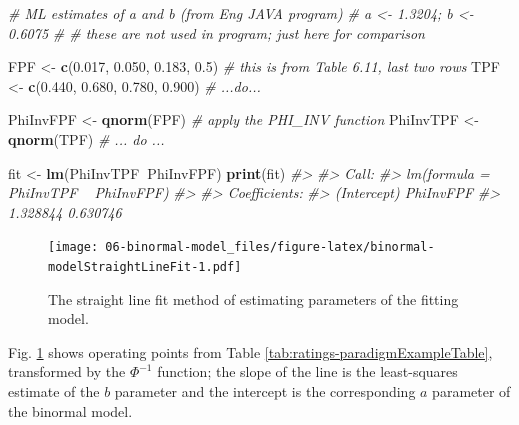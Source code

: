 \documentclass[
]{book}
\newenvironment{Shaded}{\begin{snugshade}}{\end{snugshade}}
\newcommand{\CommentTok}[1]{\textcolor[rgb]{0.56,0.35,0.01}{\textit{#1}}}
\newcommand{\FloatTok}[1]{\textcolor[rgb]{0.00,0.00,0.81}{#1}}
\newcommand{\KeywordTok}[1]{\textcolor[rgb]{0.13,0.29,0.53}{\textbf{#1}}}
\newcommand{\NormalTok}[1]{#1}
\newcommand{\OperatorTok}[1]{\textcolor[rgb]{0.81,0.36,0.00}{\textbf{#1}}}
\newcommand{\StringTok}[1]{\textcolor[rgb]{0.31,0.60,0.02}{#1}}
\begin{document}
\begin{Shaded}
\begin{Highlighting}[]
\CommentTok{# ML estimates of a and b (from Eng JAVA program)}
\CommentTok{# a <- 1.3204; b <- 0.6075 }
\CommentTok{# # these are not used in program; just here for comparison}

\NormalTok{FPF <-}\StringTok{ }\KeywordTok{c}\NormalTok{(}\FloatTok{0.017}\NormalTok{, }\FloatTok{0.050}\NormalTok{, }\FloatTok{0.183}\NormalTok{, }\FloatTok{0.5}\NormalTok{)  }
\CommentTok{# this is from Table 6.11, last two rows}
\NormalTok{TPF <-}\StringTok{ }\KeywordTok{c}\NormalTok{(}\FloatTok{0.440}\NormalTok{, }\FloatTok{0.680}\NormalTok{, }\FloatTok{0.780}\NormalTok{, }\FloatTok{0.900}\NormalTok{)}
\CommentTok{# ...do...}

\NormalTok{PhiInvFPF <-}\StringTok{ }\KeywordTok{qnorm}\NormalTok{(FPF)}
\CommentTok{# apply the PHI_INV function}
\NormalTok{PhiInvTPF <-}\StringTok{ }\KeywordTok{qnorm}\NormalTok{(TPF)}
\CommentTok{# ... do ... }

\NormalTok{fit <-}\StringTok{ }\KeywordTok{lm}\NormalTok{(PhiInvTPF}\OperatorTok{~}\NormalTok{PhiInvFPF)}
\KeywordTok{print}\NormalTok{(fit)}
\CommentTok{#> }
\CommentTok{#> Call:}
\CommentTok{#> lm(formula = PhiInvTPF ~ PhiInvFPF)}
\CommentTok{#> }
\CommentTok{#> Coefficients:}
\CommentTok{#> (Intercept)    PhiInvFPF  }
\CommentTok{#>    1.328844     0.630746}
\end{Highlighting}
\end{Shaded}

\begin{figure}
\centering
\texttt{[image: 06-binormal-model\_files/figure-latex/binormal-modelStraightLineFit-1.pdf]}
\caption{\label{fig:binormal-modelStraightLineFit}The straight line fit method of estimating parameters of the fitting model.}
\end{figure}

Fig. \ref{fig:binormal-modelStraightLineFit} shows operating points from Table \ref{tab:ratings-paradigmExampleTable}, transformed by the \(\Phi^{-1}\) function; the slope of the line is the least-squares estimate of the \(b\) parameter and the intercept is the corresponding \(a\) parameter of the binormal model.
\end{document}
